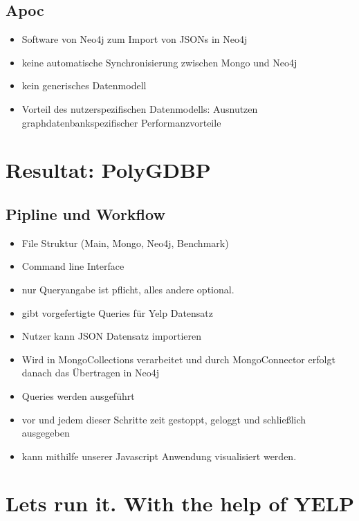 \documentclass[12pt,usenames,dvipsnames]{beamer}
\begin{document}
\subsection{Apoc}
\begin{frame}
\begin{itemize}[<+- | alert@+>]
\item Software von Neo4j zum Import von JSONs in Neo4j
\item keine automatische Synchronisierung zwischen Mongo und Neo4j
\item kein generisches Datenmodell
\item Vorteil des nutzerspezifischen Datenmodells: Ausnutzen graphdatenbankspezifischer Performanzvorteile
\end{itemize}

\end{frame}
\section{Resultat: PolyGDBP}
\subsection{Pipline und Workflow}
\begin{frame}
\begin{itemize}[<+- | alert@+>]
\item File Struktur (Main, Mongo, Neo4j, Benchmark)
\item Command line Interface
\item nur Queryangabe ist pflicht, alles andere optional.
\item gibt vorgefertigte Queries für Yelp Datensatz
\item Nutzer kann JSON Datensatz importieren
\item Wird in MongoCollections verarbeitet und durch MongoConnector erfolgt danach das Übertragen in Neo4j
\item Queries werden ausgeführt
\item vor und jedem dieser Schritte zeit gestoppt, geloggt und schließlich ausgegeben
\item kann mithilfe unserer Javascript Anwendung visualisiert werden.
\end{itemize}
\end{frame}
\section{Lets run it. With the help of YELP}
\end{document}
